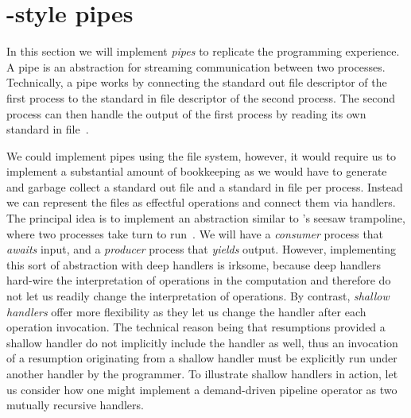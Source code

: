 \documentclass[12pt,phd,lfcs,twoside,openright,logo,leftchapter,normalheadings]{infthesis}
\theoremstyle{plain}
\theoremstyle{definition}
\begin{document}
\section{\UNIX{}-style pipes}
\label{sec:pipes}

In this section we will implement \UNIX{} \emph{pipes} to replicate
the \UNIX{} programming experience. A \UNIX{} pipe is an abstraction
for streaming communication between two processes. Technically, a pipe
works by connecting the standard out file descriptor of the first
process to the standard in file descriptor of the second process. The
second process can then handle the output of the first process by
reading its own standard in file~\cite{RitchieT74}.

We could implement pipes using the file system, however, it would
require us to implement a substantial amount of bookkeeping as we
would have to generate and garbage collect a standard out file and a
standard in file per process. Instead we can represent the files as
effectful operations and connect them via handlers. The principal idea
is to implement an abstraction similar to \citeauthor{GanzFW99}'s
seesaw trampoline, where two processes take turn to
run~\cite{GanzFW99}. We will have a \emph{consumer} process that
\emph{awaits} input, and a \emph{producer} process that \emph{yields}
output.
%
However, implementing this sort of abstraction with deep handlers is
irksome, because deep handlers hard-wire the interpretation of
operations in the computation and therefore do not let us readily
change the interpretation of operations. By contrast, \emph{shallow
  handlers} offer more flexibility as they let us change the handler
after each operation invocation. The technical reason being that
resumptions provided a shallow handler do not implicitly include the
handler as well, thus an invocation of a resumption originating from a
shallow handler must be explicitly run under another handler by the
programmer. To illustrate shallow handlers in action, let us consider
how one might implement a demand-driven \UNIX{} pipeline operator as
two mutually recursive handlers.
%
\end{document}
